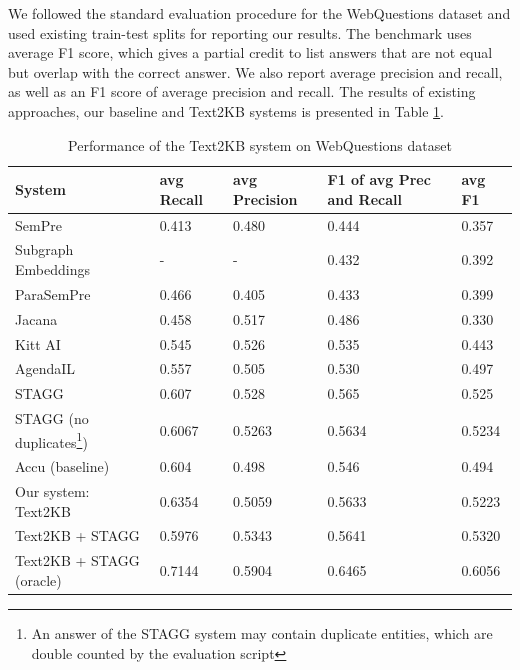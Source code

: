 
We followed the standard evaluation procedure for the WebQuestions dataset and used existing train-test splits for reporting our results.
The benchmark uses average F1 score, which gives a partial credit to list answers that are not equal but overlap with the correct answer.
We also report average precision and recall, as well as an F1 score of average precision and recall.
The results of existing approaches, our baseline and Text2KB systems is presented in Table \ref{table:webquestions_results}.

\begin{table}
\centering
\caption{Performance of the Text2KB system on WebQuestions dataset}
\label{table:webquestions_results}
\begin{tabular}{| p{5cm} | p{1.5cm} | p{1.5cm} | p{1.5cm} | p{1.5cm} | }
\hline
System & avg Recall & avg Precision & F1 of avg Prec and Recall & avg F1 \\
\hline
SemPre \cite{Berant:EMNLP13} & 0.413 & 0.480 & 0.444 & 0.357\\
Subgraph Embeddings \cite{BordesCW14:emnlp} & - & - & 0.432 & 0.392\\
ParaSemPre \cite{berant2014semantic} & 0.466 & 0.405 & 0.433 & 0.399\\
Jacana \cite{yao2014information} & 0.458 & 0.517 & 0.486 & 0.330\\
Kitt AI \cite{yao-scratch-qa-naacl2015} & 0.545 & 0.526 & 0.535 & 0.443\\
AgendaIL \cite{berant2015imitation} & 0.557 & 0.505 & 0.530 & 0.497\\
STAGG \cite{yih2015semantic} & 0.607 & 0.528 & 0.565 & 0.525\\
STAGG (no duplicates\footnote{An answer of the STAGG system may contain duplicate entities, which are double counted by the evaluation script}) \cite{yih2015semantic} & 0.6067 & 0.5263 & 0.5634 & 0.5234 \\
\hline
Accu (baseline) \cite{ACCU:2015} & 0.604 & 0.498 & 0.546 & 0.494\\
Our system: Text2KB & 0.6354 & 0.5059 & 0.5633 & 0.5223 \\
\hline
Text2KB + STAGG & 0.5976 & 0.5343 & 0.5641 & 0.5320 \\
Text2KB + STAGG (oracle) & 0.7144 & 0.5904 & 0.6465 & 0.6056 \\
\hline
\end{tabular}
\end{table}

